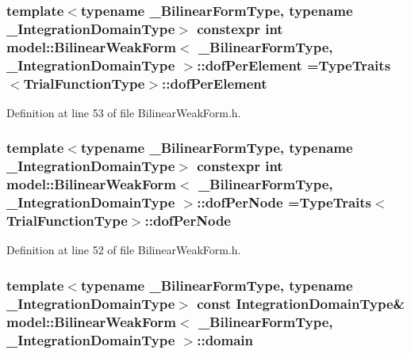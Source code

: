 \subsubsection[{dof\+Per\+Element}]{\setlength{\rightskip}{0pt plus 5cm}template$<$typename \+\_\+\+Bilinear\+Form\+Type, typename \+\_\+\+Integration\+Domain\+Type$>$ constexpr int {\bf model\+::\+Bilinear\+Weak\+Form}$<$ \+\_\+\+Bilinear\+Form\+Type, \+\_\+\+Integration\+Domain\+Type $>$\+::dof\+Per\+Element ={\bf Type\+Traits}$<${\bf Trial\+Function\+Type}$>$\+::dof\+Per\+Element\hspace{0.3cm}{\ttfamily [static]}}\label{structmodel_1_1_bilinear_weak_form_a4897458848db3e0288687935e991b3e5}


Definition at line 53 of file Bilinear\+Weak\+Form.\+h.

\hypertarget{structmodel_1_1_bilinear_weak_form_a1033a799da488ed074d9c49c78bf83be}{}
\subsubsection[{dof\+Per\+Node}]{\setlength{\rightskip}{0pt plus 5cm}template$<$typename \+\_\+\+Bilinear\+Form\+Type, typename \+\_\+\+Integration\+Domain\+Type$>$ constexpr int {\bf model\+::\+Bilinear\+Weak\+Form}$<$ \+\_\+\+Bilinear\+Form\+Type, \+\_\+\+Integration\+Domain\+Type $>$\+::dof\+Per\+Node ={\bf Type\+Traits}$<${\bf Trial\+Function\+Type}$>$\+::dof\+Per\+Node\hspace{0.3cm}{\ttfamily [static]}}\label{structmodel_1_1_bilinear_weak_form_a1033a799da488ed074d9c49c78bf83be}


Definition at line 52 of file Bilinear\+Weak\+Form.\+h.

\hypertarget{structmodel_1_1_bilinear_weak_form_acc22ce08d028763977a7d0427f0117b3}{}
\subsubsection[{domain}]{\setlength{\rightskip}{0pt plus 5cm}template$<$typename \+\_\+\+Bilinear\+Form\+Type, typename \+\_\+\+Integration\+Domain\+Type$>$ const {\bf Integration\+Domain\+Type}\& {\bf model\+::\+Bilinear\+Weak\+Form}$<$ \+\_\+\+Bilinear\+Form\+Type, \+\_\+\+Integration\+Domain\+Type $>$\+::domain}\label{structmodel_1_1_bilinear_weak_form_acc22ce08d028763977a7d0427f0117b3}



